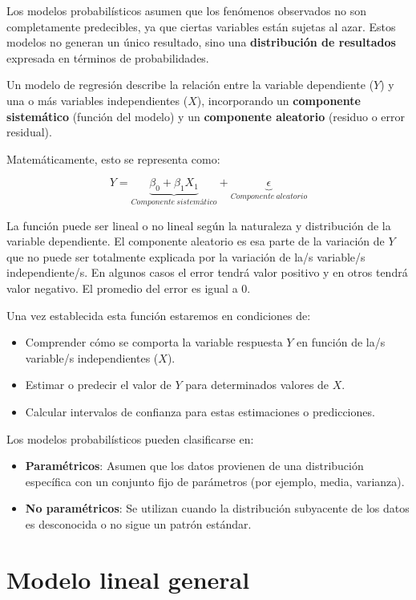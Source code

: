 \documentclass[
  spanish,
  a4paper,
]{scrbook}
\begin{document}
Los modelos probabilísticos asumen que los fenómenos observados no son
completamente predecibles, ya que ciertas variables están sujetas al
azar. Estos modelos no generan un único resultado, sino una
\textbf{distribución de resultados} expresada en términos de
probabilidades.

Un modelo de regresión describe la relación entre la variable
dependiente (\(Y\)) y una o más variables independientes (\(X\)),
incorporando un \textbf{componente sistemático} (función del modelo) y
un \textbf{componente aleatorio} (residuo o error residual).

Matemáticamente, esto se representa como:

\[
Y = \underbrace{\beta_0 + \beta_1 X_1}_{Componente \: sistemático} + \underbrace{\epsilon}_{Componente \: aleatorio}
\]

La función puede ser lineal o no lineal según la naturaleza y
distribución de la variable dependiente. El componente aleatorio es esa
parte de la variación de \(Y\) que no puede ser totalmente explicada por
la variación de la/s variable/s independiente/s. En algunos casos el
error tendrá valor positivo y en otros tendrá valor negativo. El
promedio del error es igual a 0.

Una vez establecida esta función estaremos en condiciones de:

\begin{itemize}
\item
  Comprender cómo se comporta la variable respuesta \(Y\) en función de
  la/s variable/s independientes (\(X\)).
\item
  Estimar o predecir el valor de \(Y\) para determinados valores de
  \(X\).
\item
  Calcular intervalos de confianza para estas estimaciones o
  predicciones.
\end{itemize}

Los modelos probabilísticos pueden clasificarse en:

\begin{itemize}
\item
  \textbf{Paramétricos}: Asumen que los datos provienen de una
  distribución específica con un conjunto fijo de parámetros (por
  ejemplo, media, varianza).
\item
  \textbf{No paramétricos}: Se utilizan cuando la distribución
  subyacente de los datos es desconocida o no sigue un patrón estándar.
\end{itemize}

\section{Modelo lineal general}\label{modelo-lineal-general}
\end{document}
